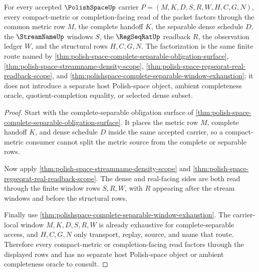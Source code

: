 \begin{theorem}
\label{thm:polish-space-compact-metric-factorization}
For every accepted $\PolishSpaceUp$ carrier $P=(M,K,D,S,R,W,H,C,G,N)$, every compact-metric or completion-facing read of the packet factors through the common metric row $M$, the complete handoff $K$, the separable dense schedule $D$, the $\StreamNameUp$ windows $S$, the $\RegSeqRatUp$ readback $R$, the observation ledger $W$, and the structural rows $H,C,G,N$. The factorization is the same finite route named by \autoref{thm:polish-space-complete-separable-obligation-surface}, \autoref{thm:polish-space-streamname-density-scope}, \autoref{thm:polish-space-regseqrat-real-readback-scope}, and \autoref{thm:polishspace-complete-separable-window-exhaustion}; it does not introduce a separate host Polish-space object, ambient completeness oracle, quotient-completion equality, or selected dense subset.
\end{theorem}
\begin{proof}
Start with the complete-separable obligation surface of \autoref{thm:polish-space-complete-separable-obligation-surface}. It places the metric row $M$, complete handoff $K$, and dense schedule $D$ inside the same accepted carrier, so a compact-metric consumer cannot split the metric source from the complete or separable rows.

Now apply \autoref{thm:polish-space-streamname-density-scope} and \autoref{thm:polish-space-regseqrat-real-readback-scope}. The dense and real-facing sides are both read through the finite window rows $S,R,W$, with $R$ appearing after the stream windows and before the structural rows.

Finally use \autoref{thm:polishspace-complete-separable-window-exhaustion}. The carrier-local window $M,K,D,S,R,W$ is already exhaustive for complete-separable access, and $H,C,G,N$ only transport, replay, source, and name that route. Therefore every compact-metric or completion-facing read factors through the displayed rows and has no separate host Polish-space object or ambient completeness oracle to consult.
\end{proof}

